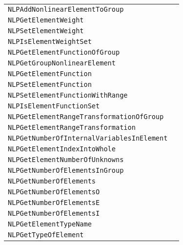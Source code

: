 \documentclass[12pt]{article}
\begin{document}
\begin{center}
\begin{tabular}{ll}
\tt NLPAddNonlinearElementToGroup&\pageref{Subroutine:NLPAddNonlinearElementToGroup}\\
\tt NLPGetElementWeight&\pageref{Subroutine:NLPGetElementWeight}\\
\tt NLPSetElementWeight&\pageref{Subroutine:NLPSetElementWeight}\\
\tt NLPIsElementWeightSet&\pageref{Subroutine:NLPIsElementWeightSet}\\
\tt NLPGetElementFunctionOfGroup&\pageref{Subroutine:NLPGetElementFunctionOfGroup}\\
\tt NLPGetGroupNonlinearElement&\pageref{Subroutine:NLPGetGroupNonlinearElement}\\
\tt NLPGetElementFunction&\pageref{Subroutine:NLPGetElementFunction}\\
\tt NLPSetElementFunction&\pageref{Subroutine:NLPSetElementFunction}\\
\tt NLPSetElementFunctionWithRange&\pageref{Subroutine:NLPSetElementFunctionWithRange}\\
\tt NLPIsElementFunctionSet&\pageref{Subroutine:NLPIsElementFunctionSet}\\
\tt NLPGetElementRangeTransformationOfGroup&\pageref{Subroutine:NLPGetElementRangeTransformationOfGroup}\\
\tt NLPGetElementRangeTransformation&\pageref{Subroutine:NLPGetElementRangeTransformation}\\
\tt NLPGetNumberOfInternalVariablesInElement&\pageref{Subroutine:NLPGetNumberOfInternalVariablesInElement}\\
\tt NLPGetElementIndexIntoWhole&\pageref{Subroutine:NLPGetElementIndexIntoWhole}\\
\tt NLPGetElementNumberOfUnknowns&\pageref{Subroutine:NLPGetElementNumberOfUnknowns}\\
\tt NLPGetNumberOfElementsInGroup&\pageref{Subroutine:NLPGetNumberOfElementsInGroup}\\
\tt NLPGetNumberOfElements&\pageref{Subroutine:NLPGetNumberOfElements}\\
\tt NLPGetNumberOfElementsO&\pageref{Subroutine:NLPGetNumberOfElementsO}\\
\tt NLPGetNumberOfElementsE&\pageref{Subroutine:NLPGetNumberOfElementsE}\\
\tt NLPGetNumberOfElementsI&\pageref{Subroutine:NLPGetNumberOfElementsI}\\
\tt NLPGetElementTypeName&\pageref{Subroutine:NLPGetElementTypeName}\\
\tt NLPGetTypeOfElement&\pageref{Subroutine:NLPGetTypeOfElement}\\
\end{tabular}
\end{center}
\newpage
\end{document}
